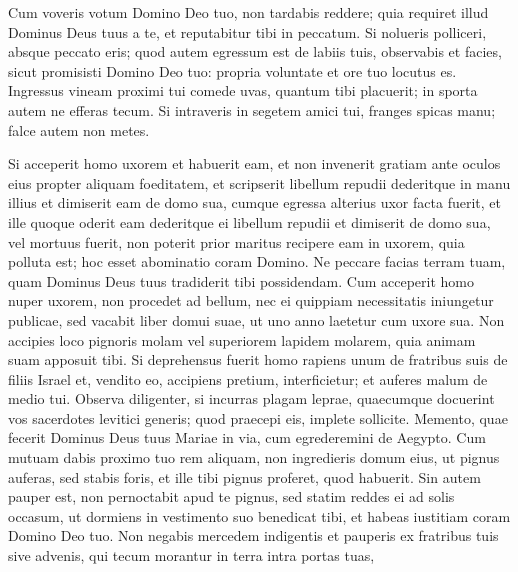 \begin{biblechapter}
\begin{biblechapter}
\begin{biblechapter}
\begin{biblechapter}
\begin{biblechapter}
\begin{biblechapter}
\begin{biblechapter}
\begin{biblechapter}
\begin{biblechapter}
\begin{biblechapter}
\begin{biblechapter}
\begin{biblechapter}
\begin{biblechapter}
\begin{biblechapter}
\begin{biblechapter}
\begin{biblechapter}
\begin{biblechapter}
\begin{biblechapter}
\begin{biblechapter}
\begin{biblechapter}
\begin{biblechapter}
\begin{biblechapter}
\begin{biblechapter}
 \verse Cum voveris votum Domino Deo tuo, non tardabis reddere; quia requiret illud Dominus Deus tuus a te, et reputabitur tibi in peccatum. 
\verse Si nolueris polliceri, absque peccato eris; 
\verse quod autem egressum est de labiis tuis, observabis et facies, sicut promisisti Domino Deo tuo: propria voluntate et ore tuo locutus es.
 \verse Ingressus vineam proximi tui comede uvas, quantum tibi placuerit; in sporta autem ne efferas tecum. 
\verse Si intraveris in segetem amici tui, franges spicas manu; falce autem non metes.
 
\begin{biblechapter}
\verse Si acceperit homo uxorem et habuerit eam, et non invenerit gratiam ante oculos eius propter aliquam foeditatem, et scripserit libellum repudii dederitque in manu illius et dimiserit eam de domo sua, 
\verse cumque egressa alterius uxor facta fuerit, 
 \verse et ille quoque oderit eam dederitque ei libellum repudii et dimiserit de domo sua, vel mortuus fuerit, 
\verse non poterit prior maritus recipere eam in uxorem, quia polluta est; hoc esset abominatio coram Domino. Ne peccare facias terram tuam, quam Dominus Deus tuus tradiderit tibi possidendam.
 \verse Cum acceperit homo nuper uxorem, non procedet ad bellum, nec ei quippiam necessitatis iniungetur publicae, sed vacabit liber domui suae, ut uno anno laetetur cum uxore sua.
 \verse Non accipies loco pignoris molam vel superiorem lapidem molarem, quia animam suam apposuit tibi.
 \verse Si deprehensus fuerit homo rapiens unum de fratribus suis de filiis Israel et, vendito eo, accipiens pretium, interficietur; et auferes malum de medio tui.
 \verse Observa diligenter, si incurras plagam leprae, quaecumque docuerint vos sacerdotes levitici generis; quod praecepi eis, implete sollicite. 
\verse Memento, quae fecerit Dominus Deus tuus Mariae in via, cum egrederemini de Aegypto.
 \verse Cum mutuam dabis proximo tuo rem aliquam, non ingredieris domum eius, ut pignus auferas, 
\verse sed stabis foris, et ille tibi pignus proferet, quod habuerit. 
\verse Sin autem pauper est, non pernoctabit apud te pignus, 
\verse sed statim reddes ei ad solis occasum, ut dormiens in vestimento suo benedicat tibi, et habeas iustitiam coram Domino Deo tuo.
 \verse Non negabis mercedem indigentis et pauperis ex fratribus tuis sive advenis, qui tecum morantur in terra intra portas tuas, 

\end{biblechapter}
\end{biblechapter}
\end{biblechapter}
\end{biblechapter}
\end{biblechapter}
\end{biblechapter}
\end{biblechapter}
\end{biblechapter}
\end{biblechapter}
\end{biblechapter}
\end{biblechapter}
\end{biblechapter}
\end{biblechapter}
\end{biblechapter}
\end{biblechapter}
\end{biblechapter}
\end{biblechapter}
\end{biblechapter}
\end{biblechapter}
\end{biblechapter}
\end{biblechapter}
\end{biblechapter}
\end{biblechapter}
\end{biblechapter}
